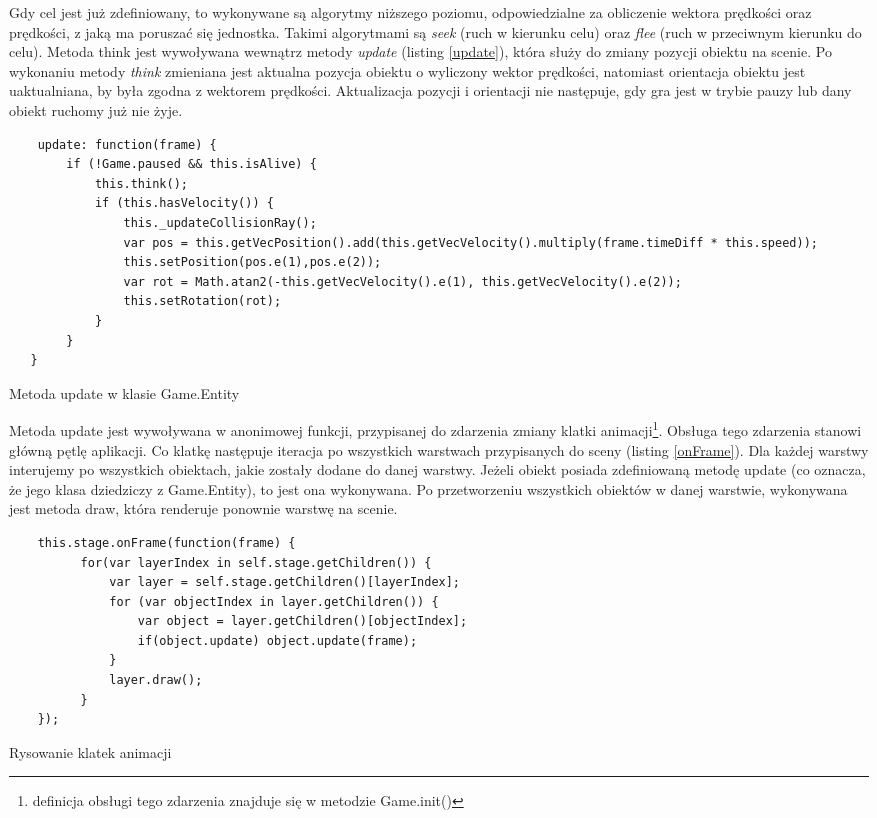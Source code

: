 Gdy cel jest już zdefiniowany, to wykonywane są algorytmy niższego poziomu, odpowiedzialne za obliczenie wektora prędkości oraz prędkości, z jaką ma poruszać się jednostka. Takimi algorytmami są \emph{seek} (ruch w kierunku celu) oraz \emph{flee} (ruch w przeciwnym kierunku do celu). Metoda think jest wywoływana wewnątrz metody \emph{update} (listing \ref{update}), która służy do zmiany pozycji obiektu na scenie. Po wykonaniu metody \emph{think} zmieniana jest aktualna pozycja obiektu o wyliczony wektor prędkości, natomiast orientacja obiektu jest uaktualniana, by była zgodna z wektorem prędkości. Aktualizacja pozycji i orientacji nie następuje, gdy gra jest w trybie pauzy lub dany obiekt ruchomy już nie żyje.

\begin{table}
\begin{center}
\begin{lstlisting}
    update: function(frame) {
        if (!Game.paused && this.isAlive) {
            this.think();
            if (this.hasVelocity()) {
                this._updateCollisionRay();
                var pos = this.getVecPosition().add(this.getVecVelocity().multiply(frame.timeDiff * this.speed));
                this.setPosition(pos.e(1),pos.e(2));
                var rot = Math.atan2(-this.getVecVelocity().e(1), this.getVecVelocity().e(2));
                this.setRotation(rot);
            }
        }
   }
 \end{lstlisting}
\caption {Metoda update w klasie Game.Entity}
\label{update}
\end{center}
\end{table}

Metoda update jest wywoływana w anonimowej funkcji, przypisanej do zdarzenia zmiany klatki animacji\footnote{definicja obsługi tego zdarzenia znajduje się w metodzie Game.init()}. Obsługa tego zdarzenia stanowi główną pętlę aplikacji. Co klatkę następuje iteracja po wszystkich warstwach przypisanych do sceny (listing \ref{onFrame}). Dla każdej warstwy interujemy po wszystkich obiektach, jakie zostały dodane do danej warstwy. Jeżeli obiekt posiada zdefiniowaną metodę update (co oznacza, że jego klasa dziedziczy z Game.Entity), to jest ona wykonywana. Po przetworzeniu wszystkich obiektów w danej warstwie, wykonywana jest metoda draw, która renderuje ponownie warstwę na scenie.

\begin{table}
\begin{center}
\begin{lstlisting}
    this.stage.onFrame(function(frame) {
          for(var layerIndex in self.stage.getChildren()) {
              var layer = self.stage.getChildren()[layerIndex];
              for (var objectIndex in layer.getChildren()) {
                  var object = layer.getChildren()[objectIndex];
                  if(object.update) object.update(frame);
              }
              layer.draw();
          }
    });
 \end{lstlisting}
\caption {Rysowanie klatek animacji}
\label{onFrame}
\end{center}
\end{table}

